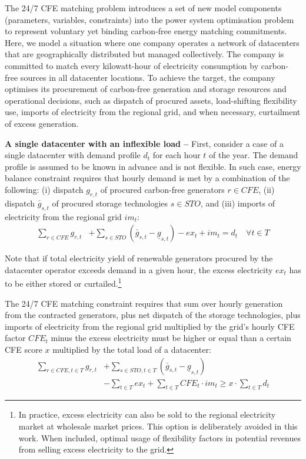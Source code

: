 
The 24/7 CFE matching problem introduces a set of new model components (parameters, variables, constraints) into the power system optimisation problem to represent voluntary yet binding carbon-free energy matching commitments. Here, we model a situation where one company operates a network of datacenters that are geographically distributed but managed collectively. The company is committed to match every kilowatt-hour of electricity consumption by carbon-free sources in all datacenter locations. To achieve the target, the company optimises its procurement of carbon-free generation and storage resources and operational decisions, such as dispatch of procured assets, load-shifting flexibility use, imports of electricity from the regional grid, and when necessary, curtailment of excess generation.

\textbf{A single datacenter with an inflexible load --} First, consider a case of a single datacenter with demand profile $d_{t}$ for each hour $t$ of the year. The demand profile is assumed to be known in advance and is not flexible. In such case, energy balance constraint requires that hourly demand is met by a combination of the following: (i) dispatch $g_{r,t}$ of procured carbon-free generators $r\in CFE$, (ii) dispatch $\bar{g}_{s,t}$ of procured storage technologies $s\in STO$, and (iii) imports of electricity from the regional grid $im_{t}$:
\begin{equation}
    \begin{split}
        \sum_{r\in CFE} g_{r,t} &+ \sum_{s\in STO} \left(\bar{g}_{s,t} - \underline{g}_{s,t}\right) - ex_t + im_t = d_t \quad \forall t \in T
    \end{split}
\label{eqn:inflexnb}
\end{equation}

Note that if total electricity yield of renewable generators procured by the datacenter operator exceeds demand in a given hour, the excess electricity $ex_t$ has to be either stored or curtailed.\footnote{In practice, excess electricity can also be sold to the regional electricity market at wholesale market prices. This option is deliberately avoided in this work. When included, optimal usage of flexibility factors in potential revenues from selling excess electricity to the grid.}

The 24/7 CFE matching constraint requires that sum over hourly generation from the contracted generators, plus net dispatch of the storage technologies, plus imports of electricity from the regional grid multiplied by the grid's hourly CFE factor $CFE_t$ minus the excess electricity must be higher or equal than a certain CFE score $x$ multiplied by the total load of a datacenter:
\begin{equation}
    \begin{split}
        \sum_{r\in CFE, t\in T} g_{r,t} &+ \sum_{s\in STO, t\in T} \left(\bar{g}_{s,t} - \underline{g}_{s,t}\right) \\
        &- \sum_{t\in T} ex_t + \sum_{t\in T} CFE_t \cdot im_t \geq x \cdot \sum_{t\in T} d_t
    \end{split}
\label{eqn:CFE}
\end{equation}


